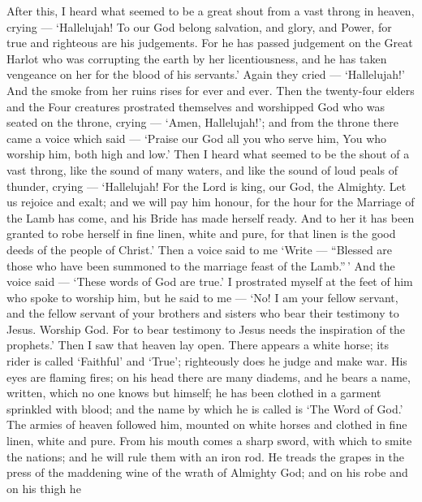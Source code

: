  After this, I heard what seemed to be a great shout from a
vast throng in heaven, crying --- `Hallelujah! To our God belong
salvation, and glory, and Power,  for true and righteous are
his judgements. For he has passed judgement on the Great Harlot who was
corrupting the earth by her licentiousness, and he has taken vengeance
on her for the blood of his servants.'  Again they cried ---
`Hallelujah!' And the smoke from her ruins rises for ever and ever.
 Then the twenty-four elders and the Four creatures
prostrated themselves and worshipped God who was seated on the throne,
crying --- `Amen, Hallelujah!';  and from the throne there
came a voice which said --- `Praise our God all you who serve him, You
who worship him, both high and low.'  Then I heard what
seemed to be the shout of a vast throng, like the sound of many waters,
and like the sound of loud peals of thunder, crying --- `Hallelujah! For
the Lord is king, our God, the Almighty.  Let us rejoice and
exalt; and we will pay him honour, for the hour for the Marriage of the
Lamb has come, and his Bride has made herself ready.  And to
her it has been granted to robe herself in fine linen, white and pure,
for that linen is the good deeds of the people of Christ.' 
Then a voice said to me `Write --- ``Blessed are those who have been
summoned to the marriage feast of the Lamb.''\,' And the voice said ---
`These words of God are true.'  I prostrated myself at the
feet of him who spoke to worship him, but he said to me --- `No! I am
your fellow servant, and the fellow servant of your brothers and sisters
who bear their testimony to Jesus. Worship God. For to bear testimony to
Jesus needs the inspiration of the prophets.'  Then I saw
that heaven lay open. There appears a white horse; its rider is called
`Faithful' and `True'; righteously does he judge and make war.
 His eyes are flaming fires; on his head there are many
diadems, and he bears a name, written, which no one knows but himself;
 he has been clothed in a garment sprinkled with blood; and
the name by which he is called is `The Word of God.'  The
armies of heaven followed him, mounted on white horses and clothed in
fine linen, white and pure.  From his mouth comes a sharp
sword, with which to smite the nations; and he will rule them with an
iron rod. He treads the grapes in the press of the maddening wine of the
wrath of Almighty God;  and on his robe and on his thigh he
